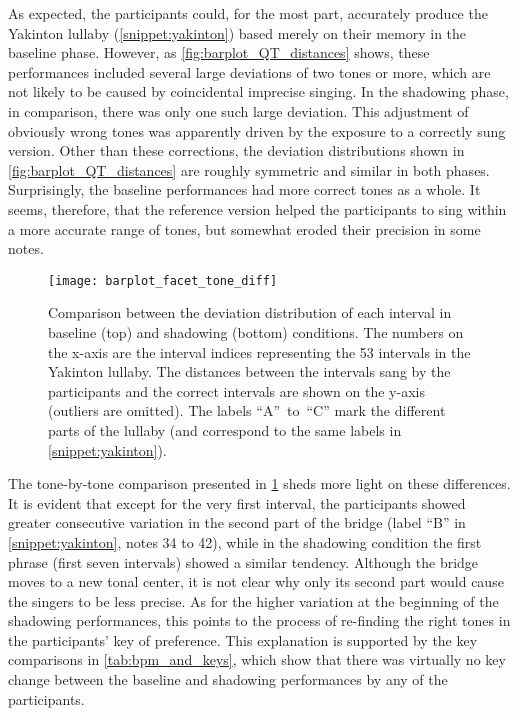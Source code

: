 As expected, the participants could, for the most part, accurately produce the Yakinton lullaby (\cref{snippet:yakinton}) based merely on their memory in the baseline phase.
However, as \cref{fig:barplot_QT_distances} shows, these performances included several large deviations of two tones or more, which are not likely to be caused by coincidental imprecise singing.
In the shadowing phase, in comparison, there was only one such large deviation.
This adjustment of obviously wrong tones was apparently driven by the exposure to a correctly sung version.
Other than these corrections, the deviation distributions shown in \cref{fig:barplot_QT_distances} are roughly symmetric and similar in both phases.
Surprisingly, the baseline performances had more correct tones as a whole.
It seems, therefore, that the reference version helped the participants to sing within a more accurate range of tones, but somewhat eroded their precision in some notes.
%
\begin{figure}[t]
	\centering
	\texttt{[image: barplot\_facet\_tone\_diff]}
	\caption[Comparison of interval deviation between baseline and shadowing performances]
		{Comparison between the deviation distribution of each interval in baseline (top) and shadowing (bottom) conditions.
		The numbers on the x-axis are the interval indices representing the 53 intervals in the Yakinton lullaby.
		The distances between the intervals sang by the participants and the correct intervals are shown on the y-axis (outliers are omitted).
		The labels \enquote{A}~to~\enquote{C} mark the different parts of the lullaby (and correspond to the same labels in \cref{snippet:yakinton}).}
	\label{fig:barplot_facet_tone_diff}
\end{figure}
%
The tone-by-tone comparison presented in \cref{fig:barplot_facet_tone_diff} sheds more light on these differences.
It is evident that except for the very first interval, the participants showed greater consecutive variation in the second part of the bridge (label \enquote{B} in \cref{snippet:yakinton}, notes 34 to 42), while in the shadowing condition the first phrase (first seven intervals) showed a similar tendency.
Although the bridge moves to a new tonal center, it is not clear why only its second part would cause the singers to be less precise.
As for the higher variation at the beginning of the shadowing performances, this points to the process of re-finding the right tones in the participants' key of preference.
This explanation is supported by the key comparisons in \cref{tab:bpm_and_keys}, which show that there was virtually no key change between the baseline and shadowing performances by any of the participants.
